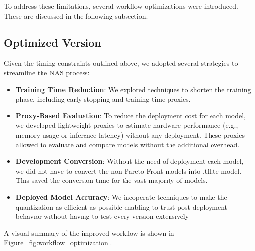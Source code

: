 To address these limitations, several workflow optimizations were introduced. These are discussed in the following subsection.

\subsection{Optimized Version}
Given the timing constraints outlined above, we adopted several strategies to streamline the NAS process:

\begin{itemize}
    \item \textbf{Training Time Reduction}: We explored techniques to shorten the training phase, including early stopping and training-time proxies.

    \item \textbf{Proxy-Based Evaluation}: To reduce the deployment cost for each model, we developed lightweight proxies to estimate hardware performance (e.g., memory usage or inference latency) without any deployment. These proxies allowed to evaluate and compare models without the additional overhead.
    
    \item \textbf{Development Conversion}: Without the need of deployment each model, we did not have to convert the non-Pareto Front models into .tflite model. This saved the conversion time for the vast majority of models.
    
    \item \textbf{Deployed Model Accuracy}: We incoperate techniques to make the quantization as efficient as possible enabling to trust post-deployment behavior without having to test every version extensively
    
\end{itemize}

A visual summary of the improved workflow is shown in Figure~\ref{fig:workflow_optimization}.


